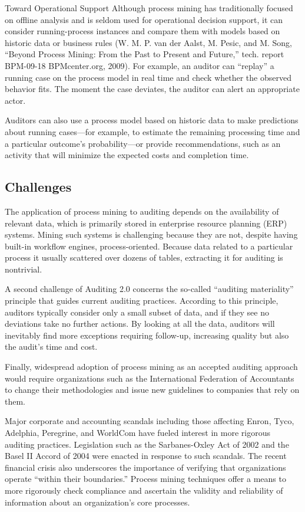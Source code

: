 Toward Operational Support
Although process mining has traditionally focused on offline analysis and is seldom used for operational decision support, it can consider running-process instances and compare them with models based on historic data or business rules (W. M. P. van der Aalst, M. Pesic, and M. Song, “Beyond Process Mining: From the Past to Present and Future,” tech. report BPM-09-18 BPMcenter.org, 2009). For example, an auditor can “replay” a running case on the process model in real time and check whether the observed behavior fits. The moment the case deviates, the auditor can alert an appropriate actor.

Auditors can also use a process model based on historic data to make predictions about running cases—for example, to estimate the remaining processing time and a particular outcome's probability—or provide recommendations, such as an activity that will minimize the expected costs and completion time.

\subsection{Challenges}

The application of process mining to auditing depends on the availability of relevant data, which is primarily stored in enterprise resource planning (ERP) systems. Mining such systems is challenging because they are not, despite having built-in workflow engines, process-oriented. Because data related to a particular process it usually scattered over dozens of tables, extracting it for auditing is nontrivial. %

A second challenge of Auditing 2.0 concerns the so-called “auditing materiality” principle that guides current auditing practices. According to this principle, auditors typically consider only a small subset of data, and if they see no deviations take no further actions. By looking at all the data, auditors will inevitably find more exceptions requiring follow-up, increasing quality but also the audit's time and cost.

Finally, widespread adoption of process mining as an accepted auditing approach would require organizations such as the International Federation of Accountants to change their methodologies and issue new guidelines to companies that rely on them.

Major corporate and accounting scandals including those affecting Enron, Tyco, Adelphia, Peregrine, and WorldCom have fueled interest in more rigorous auditing practices. Legislation such as the Sarbanes-Oxley Act of 2002 and the Basel II Accord of 2004 were enacted in response to such scandals. The recent financial crisis also underscores the importance of verifying that organizations operate “within their boundaries.” Process mining techniques offer a means to more rigorously check compliance and ascertain the validity and reliability of information about an organization's core processes.

